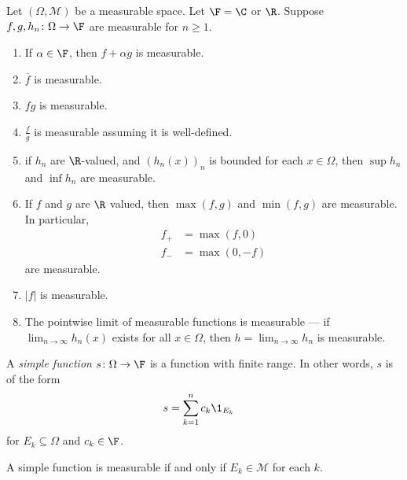 \begin{proposition}
  Let $\left(\Omega,\mathcal{M}\right)$ be a measurable space. Let $\F = \C$ or $\R$. Suppose $f,g,h_n\colon \Omega\rightarrow \F$ are measurable for $n\geq 1$.
  \begin{enumerate}[(1)]
    \item If $\alpha \in \F$, then $f + \alpha g$ is measurable.
    \item $\overline{f}$ is measurable.
    \item $fg$ is measurable.
    \item $\frac{f}{g}$ is measurable assuming it is well-defined.
    \item if $h_n$ are $\R$-valued, and $\left(h_n\left(x\right)\right)_n$ is bounded for each $x\in \Omega$, then $\sup h_n$ and $\inf h_n$ are measurable.
    \item If $f$ and $g$ are $\R$ valued, then $\max\left(f,g\right)$ and $\min\left(f,g\right)$ are measurable. In particular,
      \begin{align*}
        f_{+} &= \max\left(f,0\right)\\
        f_{-} &= \max\left(0,-f\right)
      \end{align*}
      are measurable.
    \item $\left\vert f \right\vert$ is measurable.
    \item The pointwise limit of measurable functions is measurable --- if $\lim_{n\rightarrow\infty}h_n\left(x\right)$ exists for all $x\in \Omega$, then $h = \lim_{n\rightarrow\infty}h_n$ is measurable.
  \end{enumerate}
\end{proposition}
\begin{definition}
  A \textit{simple function} $s\colon \Omega\rightarrow \F$ is a function with finite range. In other words, $s$ is of the form
  \begin{align*}
    s &= \sum_{k=1}^{n}c_k\1_{E_k}
  \end{align*}
  for $E_k\subseteq \Omega$ and $c_k\in \F$.
\end{definition}
\begin{fact}
A simple function is measurable if and only if $E_k\in \mathcal{M}$ for each $k$.
\end{fact}
